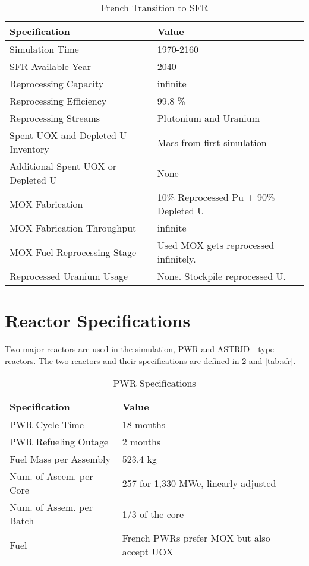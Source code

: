 \begin{table}[h]
	\centering
	\begin{tabularx}{\textwidth}{bb}
		\hline
		Specification & Value \\
		\hline
		Simulation Time & 1970-2160 \\
		\gls{SFR} Available Year & 2040 \\
		Reprocessing Capacity & infinite \\
		Reprocessing Efficiency & 99.8 \% \\
		Reprocessing Streams & Plutonium and Uranium \\
		\small{Spent \gls{UOX} and Depleted U Inventory} & Mass from first simulation \\
		\small{Additional Spent \gls{UOX} or Depleted U} & None  \\
		\gls{MOX} Fabrication &  \small{10\% Reprocessed Pu + 90\% Depleted U}  \\
		\gls{MOX} Fabrication Throughput & infinite \\
		\gls{MOX} Fuel Reprocessing Stage &  Used \gls{MOX} gets reprocessed infinitely. \\
		Reprocessed Uranium Usage &  None. Stockpile reprocessed U. \\
		\hline
	\end{tabularx}
	\caption {French Transition to \gls{SFR}}
	\label{tab:sim_france}
\end{table}


\section{Reactor Specifications}
Two major reactors are used in the simulation, \gls{PWR} and ASTRID - type reactors.
The two reactors and their specifications are defined in \cref{tab:pwr} and \cref{tab:sfr}.

\begin{table}[h]
	\centering
	\begin{tabularx}{\textwidth}{bb}
		\hline
		Specification & Value \\
		\hline
		PWR Cycle Time & 18 months \\ 
		PWR Refueling Outage & 2 months \\
		Fuel Mass per Assembly & 523.4 kg \\
		Num. of Aseem. per Core & 257 for 1,330 MWe, linearly adjusted\\
		Num. of Assem. per Batch & 1/3 of the core \\
		Fuel & \small{French \glspl{PWR} prefer \gls{MOX} but also accept \gls{UOX}}\\
		\hline
	\end{tabularx}
	\caption {\gls{PWR} Specifications}
	\label{tab:pwr}
	\end{table}
	
